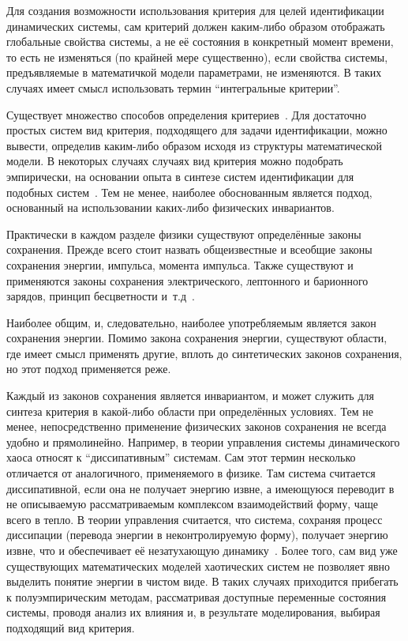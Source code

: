 Для создания возможности использования критерия
для целей идентификации динамических системы,
сам критерий должен каким-либо образом отображать
глобальные свойства системы, а не её состояния в конкретный момент времени,
то есть не изменяться (по крайней мере существенно),
если свойства системы, предъявляемые в математичкой модели параметрами,
не изменяются. В таких случаях имеет смысл использовать
термин ``интегральные критерии''.



Существует множество способов определения
критериев~\cite{atu_asau11,atu_asau12,atu_asau14,atu_khar_autodor25,atu_asau18,atu_st79,atu_apir2013}.
Для достаточно простых систем вид критерия,
подходящего для задачи идентификации, можно вывести,
определив каким-либо образом исходя из структуры
математической модели.
В некоторых случаях случаях вид критерия можно подобрать эмпирически,
на основании опыта в синтезе систем идентификации для подобных
систем~\cite{atu_asau24}. Тем не менее, наиболее обоснованным
является подход, основанный на использовании
каких-либо физических инвариантов.

Практически в каждом разделе физики существуют
определённые законы сохранения.
Прежде всего стоит назвать общеизвестные и всеобщие
законы сохранения энергии, импульса, момента импульса.
Также существуют и применяются законы сохранения
электрического, лептонного и барионного зарядов,
принцип бесцветности и~т.д~\cite{vigner_invar}.

Наиболее общим, и, следовательно, наиболее употребляемым является
закон сохранения энергии.
Помимо закона сохранения энергии, существуют области,
где имеет смысл применять другие, вплоть до синтетических
законов сохранения, но этот подход
применяется реже.

Каждый из законов сохранения является инвариантом,
и может служить для синтеза критерия в какой-либо области
при определённых условиях.
Тем не менее, непосредственно применение
физических законов сохранения не всегда
удобно и прямолинейно.
Например, в теории управления системы динамического
хаоса относят к ``диссипативным'' системам.
Сам этот термин несколько отличается от аналогичного,
применяемого в физике.
Там система считается диссипативной, если она не
получает энергию извне, а имеющуюся переводит
в не описываемую рассматриваемым комплексом взаимодействий
форму, чаще всего в тепло. 
В теории управления
считается, что система, сохраняя процесс диссипации
(перевода энергии в неконтролируемую форму),
получает энергию извне, что и обеспечивает её незатухающую
динамику~\cite{prigogine_selforganization,chernavskii_syn_info,prigogine_order_from_chaos}.
Более того, сам вид уже существующих
математических моделей хаотических систем не позволяет
явно выделить понятие энергии в чистом виде.
В таких случаях
приходится прибегать к полуэмпирическим методам,
рассматривая доступные переменные состояния системы,
проводя анализ их влияния и, в результате моделирования,
выбирая подходящий вид критерия.



